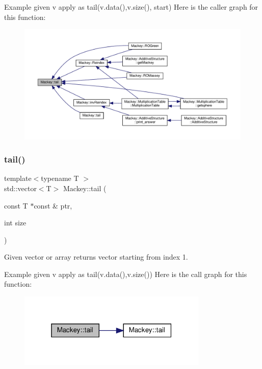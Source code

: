 Example given v apply as tail(v.\+data(),v.\+size(), start) Here is the caller graph for this function\+:\nopagebreak
\begin{figure}[H]
\begin{center}
\leavevmode
\includegraphics[width=350pt]{namespaceMackey_a1e4b11e9d2a5b70f8380af87cae31ef3_icgraph}
\end{center}
\end{figure}
\mbox{\label{namespaceMackey_a4403b34f0680dfccf2ab79111f832ba3}} 
\subsubsection{\texorpdfstring{tail()}{tail()}\hspace{0.1cm}{\footnotesize\ttfamily [2/2]}}
{\footnotesize\ttfamily template$<$typename T $>$ \\
std\+::vector$<$T$>$ Mackey\+::tail (\begin{DoxyParamCaption}\item[{const T $\ast$const \&}]{ptr,  }\item[{int}]{size }\end{DoxyParamCaption})\hspace{0.3cm}{\ttfamily [inline]}}



Given vector or array returns vector starting from index 1. 

Example given v apply as tail(v.\+data(),v.\+size()) Here is the call graph for this function\+:\nopagebreak
\begin{figure}[H]
\begin{center}
\leavevmode
\includegraphics[width=256pt]{namespaceMackey_a4403b34f0680dfccf2ab79111f832ba3_cgraph}
\end{center}
\end{figure}
\mbox{\label{namespaceMackey_a671613d53fc3b0c9c4b115bc8b2797e6}} 
